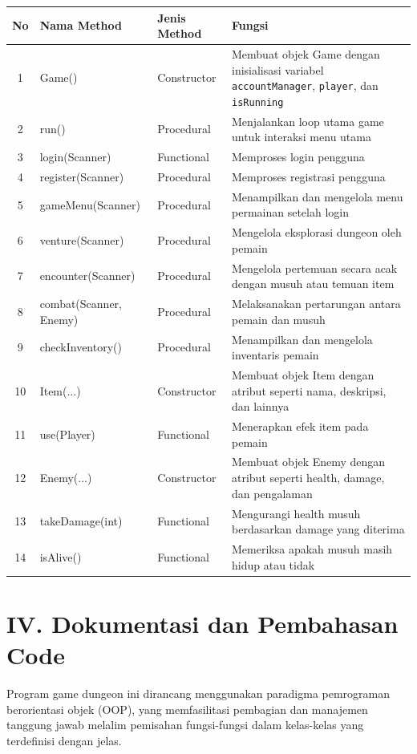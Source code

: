 \documentclass{article}
\begin{document}
\begin{tabular}{|c|l|l|p{7cm}|}
\hline
No & Nama Method & Jenis Method & Fungsi \\
\hline
1 & Game() & Constructor & Membuat objek Game dengan inisialisasi variabel \texttt{accountManager}, \texttt{player}, dan \texttt{isRunning} \\
2 & run() & Procedural & Menjalankan loop utama game untuk interaksi menu utama \\
3 & login(Scanner) & Functional & Memproses login pengguna \\
4 & register(Scanner) & Procedural & Memproses registrasi pengguna \\
5 & gameMenu(Scanner) & Procedural & Menampilkan dan mengelola menu permainan setelah login \\
6 & venture(Scanner) & Procedural & Mengelola eksplorasi dungeon oleh pemain \\
7 & encounter(Scanner) & Procedural & Mengelola pertemuan secara acak dengan musuh atau temuan item \\
8 & combat(Scanner, Enemy) & Procedural & Melaksanakan pertarungan antara pemain dan musuh \\
9 & checkInventory() & Procedural & Menampilkan dan mengelola inventaris pemain \\
10 & Item(...) & Constructor & Membuat objek Item dengan atribut seperti nama, deskripsi, dan lainnya \\
11 & use(Player) & Functional & Menerapkan efek item pada pemain \\
12 & Enemy(...) & Constructor & Membuat objek Enemy dengan atribut seperti health, damage, dan pengalaman \\
13 & takeDamage(int) & Functional & Mengurangi health musuh berdasarkan damage yang diterima \\
14 & isAlive() & Functional & Memeriksa apakah musuh masih hidup atau tidak \\
\hline
\end{tabular}

\section*{IV. Dokumentasi dan Pembahasan Code}

Program game dungeon ini dirancang menggunakan paradigma pemrograman berorientasi objek (OOP), yang memfasilitasi pembagian dan manajemen tanggung jawab melalim pemisahan fungsi-fungsi dalam kelas-kelas yang terdefinisi dengan jelas. 
\end{document}
